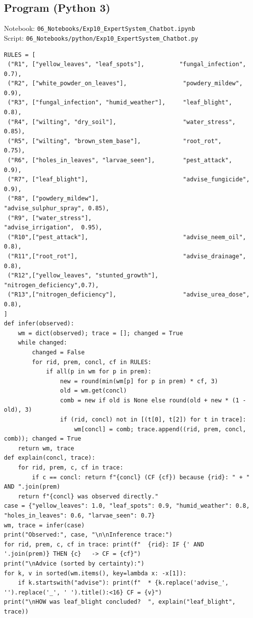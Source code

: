 \documentclass[11pt]{article}
\begin{document}
\subsection*{Program (Python 3)}
{\small\color{slate}Notebook: \texttt{06\_Notebooks/Exp10\_ExpertSystem\_Chatbot.ipynb}\\ Script: \texttt{06\_Notebooks/python/Exp10\_ExpertSystem\_Chatbot.py}}
\begin{lstlisting}[style=py]
RULES = [
 ("R1", ["yellow_leaves", "leaf_spots"],          "fungal_infection",   0.7),
 ("R2", ["white_powder_on_leaves"],                "powdery_mildew",     0.9),
 ("R3", ["fungal_infection", "humid_weather"],     "leaf_blight",        0.8),
 ("R4", ["wilting", "dry_soil"],                   "water_stress",       0.85),
 ("R5", ["wilting", "brown_stem_base"],            "root_rot",           0.75),
 ("R6", ["holes_in_leaves", "larvae_seen"],        "pest_attack",        0.9),
 ("R7", ["leaf_blight"],                           "advise_fungicide",   0.9),
 ("R8", ["powdery_mildew"],                        "advise_sulphur_spray", 0.85),
 ("R9", ["water_stress"],                          "advise_irrigation",  0.95),
 ("R10",["pest_attack"],                           "advise_neem_oil",    0.8),
 ("R11",["root_rot"],                              "advise_drainage",    0.8),
 ("R12",["yellow_leaves", "stunted_growth"],       "nitrogen_deficiency",0.7),
 ("R13",["nitrogen_deficiency"],                   "advise_urea_dose",   0.8),
]
def infer(observed):
    wm = dict(observed); trace = []; changed = True
    while changed:
        changed = False
        for rid, prem, concl, cf in RULES:
            if all(p in wm for p in prem):
                new = round(min(wm[p] for p in prem) * cf, 3)
                old = wm.get(concl)
                comb = new if old is None else round(old + new * (1 - old), 3)
                if (rid, concl) not in [(t[0], t[2]) for t in trace]:
                    wm[concl] = comb; trace.append((rid, prem, concl, comb)); changed = True
    return wm, trace
def explain(concl, trace):
    for rid, prem, c, cf in trace:
        if c == concl: return f"{concl} (CF {cf}) because {rid}: " + " AND ".join(prem)
    return f"{concl} was observed directly."
case = {"yellow_leaves": 1.0, "leaf_spots": 0.9, "humid_weather": 0.8, "holes_in_leaves": 0.6, "larvae_seen": 0.7}
wm, trace = infer(case)
print("Observed:", case, "\n\nInference trace:")
for rid, prem, c, cf in trace: print(f"  {rid}: IF {' AND '.join(prem)} THEN {c}   -> CF = {cf}")
print("\nAdvice (sorted by certainty):")
for k, v in sorted(wm.items(), key=lambda x: -x[1]):
    if k.startswith("advise"): print(f"  * {k.replace('advise_', '').replace('_', ' ').title():<16} CF = {v}")
print("\nHOW was leaf_blight concluded?  ", explain("leaf_blight", trace))
\end{lstlisting}
\end{document}
